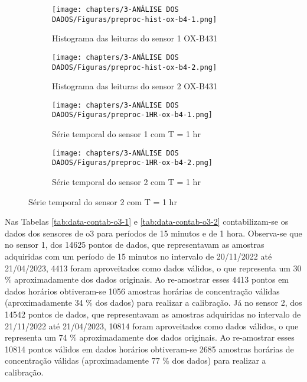 \begin{figure}[h]
    \centering
    \caption{Histogramas e séries temporais horárias das leituras dos sensores OX-B431}
    \begin{subfigure}{0.4\textwidth}
        \texttt{[image: chapters/3-ANÁLISE DOS DADOS/Figuras/preproc-hist-ox-b4-1.png]}
        \caption{Histograma das leituras do sensor 1 OX-B431}
        \label{fig:data-o3-1-preproc-hist}
    \end{subfigure}
    \hfill
    \begin{subfigure}{0.4\textwidth}
        \texttt{[image: chapters/3-ANÁLISE DOS DADOS/Figuras/preproc-hist-ox-b4-2.png]}
        \caption{Histograma das leituras do sensor 2 OX-B431}
        \label{fig:data-o3-2-preproc-hist}
    \end{subfigure}
    \hfill
    \begin{subfigure}{0.4\textwidth}
        \texttt{[image: chapters/3-ANÁLISE DOS DADOS/Figuras/preproc-1HR-ox-b4-1.png]}
        \caption{Série temporal do sensor 1 com T = 1 hr}
        \label{fig:data-o3-1-preproc-1HR}
    \end{subfigure}
    \hfill
    \begin{subfigure}{0.4\textwidth}
        \texttt{[image: chapters/3-ANÁLISE DOS DADOS/Figuras/preproc-1HR-ox-b4-2.png]}
        \caption{Série temporal do sensor 2 com T = 1 hr}
        \label{fig:data-o3-2-preproc-1HR}
    \end{subfigure}
\end{figure}

Nas Tabelas \ref{tab:data-contab-o3-1} e \ref{tab:data-contab-o3-2} contabilizam-se os dados dos sensores de \acrshort{o3} para períodos de 15 minutos e de 1 hora. Observa-se que no sensor 1, dos 14625 pontos de dados, que representavam as amostras adquiridas com um período de 15 minutos no intervalo de 20/11/2022 até 21/04/2023, 4413 foram aproveitados como dados válidos, o que representa um 30 \% aproximadamente dos dados originais. Ao re-amostrar esses 4413 pontos em dados horários obtiveram-se 1056 amostras horárias de concentração válidas (aproximadamente 34 \% dos dados) para realizar a calibração. Já no sensor 2, dos 14542 pontos de dados, que representavam as amostras adquiridas no intervalo de 21/11/2022 até 21/04/2023, 10814 foram aproveitados como dados válidos, o que representa um 74 \% aproximadamente dos dados originais. Ao re-amostrar esses 10814 pontos válidos em dados horários obtiveram-se 2685 amostras horárias de concentração válidas (aproximadamente 77 \% dos dados) para realizar a calibração.

